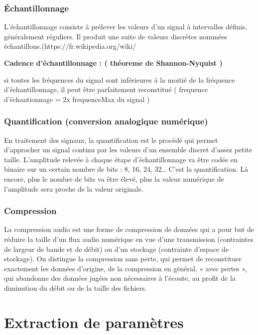 \documentclass[a4paper, 12pt]{book}
\begin{document}
\subsubsection{Échantillonnage}

L'échantillonnage consiste à prélever les valeurs d'un signal à intervalles définis, généralement réguliers. Il produit une suite de valeurs discrètes nommées échantillons.(https://fr.wikipedia.org/wiki/%

\textbf{Cadence d'échantillonnage : ( théoreme de Shannon-Nyquist )}

si toutes les fréquences du signal sont inférieures à la moitié de la fréquence d'échantillonnage, il peut être parfaitement reconstitué ( frequence d’échantionnage = 2x frequenceMax du signal )

\subsubsection{Quantification (conversion analogique numérique)}
En traitement des signaux, la quantification est le procédé qui permet d'approcher un signal continu par les valeurs d'un ensemble discret d'assez petite taille. L’amplitude relevée à chaque étape d’échantillonnage va être codée en binaire sur un certain nombre de bits : 8, 16, 24, 32… C’est la quantification. Là encore, plus le nombre de bits va être élevé, plus la valeur numérique de l’amplitude sera proche de la valeur originale.

\subsubsection{Compression}
La compression audio est une forme de compression de données qui a pour but de réduire la taille d'un flux audio numérique en vue d'une transmission (contraintes de largeur de bande et de débit) ou d'un stockage (contrainte d'espace de stockage). On distingue la compression sans perte, qui permet de reconstituer exactement les données d'origine, de la compression en général, « avec pertes », qui abandonne des données jugées non nécessaires à l'écoute, au profit de la diminution du débit ou de la taille des fichiers. 



\section{Extraction de paramètres}
\end{document}
